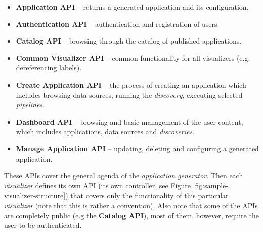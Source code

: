 \begin{itemize}
\item \textbf{Application API} -- returns a generated application and its configuration.
\item \textbf{Authentication API} -- authentication and registration of users.
\item \textbf{Catalog API} -- browsing through the catalog of published applications.
\item \textbf{Common Visualizer API} -- common functionality for all visualizers (e.g. dereferencing labels).
\item \textbf{Create Application API} -- the process of creating an application which includes browsing data sources, running the \emph{discovery}, executing selected \emph{pipelines}.
\item \textbf{Dashboard API} -- browsing and basic management of the user content, which includes applications, data sources and \emph{discoveries}.
\item \textbf{Manage Application API} -- updating, deleting and configuring a generated application.
\end{itemize}

These APIs cover the general agenda of the \emph{application generator}. Then each \emph{visualizer} defines its own API (its own controller, see Figure \ref{fig:sample-visualizer-structure}) that covers only the functionality of this particular \emph{visualizer} (note that this is rather a convention). Also note that some of the APIs are completely public (e.g the \textbf{Catalog API}), most of them, however, require the user to be authenticated.

